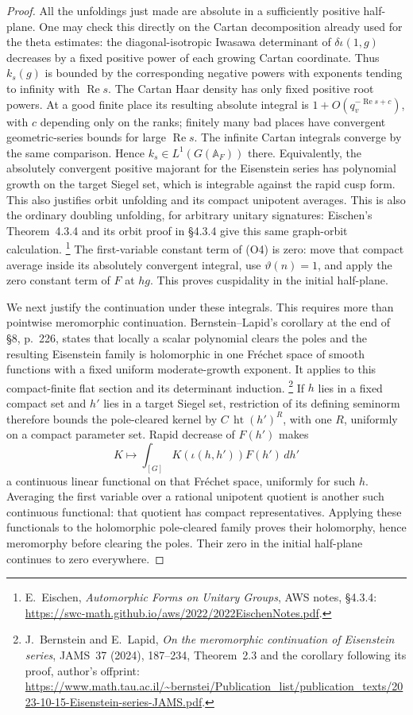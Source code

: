 \begin{proof}
All the unfoldings just made are absolute in a sufficiently
positive half-plane. One may check this directly on the
Cartan decomposition already used for the theta estimates:
the diagonal-isotropic Iwasawa determinant of
\(\delta\iota(1,g)\) decreases by a fixed positive power of
each growing Cartan coordinate. Thus \(k_s(g)\) is bounded
by the corresponding negative powers with exponents tending
to infinity with \(\operatorname{Re}s\).
The Cartan Haar density has only fixed positive root powers.
At a good finite place its resulting absolute integral is
\(1+O(q_v^{-\operatorname{Re}s+c})\), with \(c\) depending
only on the ranks; finitely many bad places have convergent
geometric-series bounds for large \(\operatorname{Re}s\).
The infinite Cartan integrals converge by the same comparison.
Hence \(k_s\in L^1(G(\mathbb A_F))\) there.
Equivalently, the absolutely convergent positive majorant
for the Eisenstein series has polynomial growth on the
target Siegel set, which is integrable against the rapid
cusp form. This also justifies orbit unfolding and its
compact unipotent averages. This is also the ordinary
doubling unfolding, for arbitrary unitary signatures:
Eischen's Theorem~4.3.4 and its orbit proof in
\S4.3.4 give this same graph-orbit calculation.
\footnote{E.~Eischen, \emph{Automorphic Forms on Unitary Groups},
AWS notes, \S4.3.4:
\url{https://swc-math.github.io/aws/2022/2022EischenNotes.pdf}.}
The first-variable constant term of (O4) is zero:
move that compact average inside its absolutely convergent
integral, use \(\vartheta(n)=1\), and apply the zero
constant term of \(F\) at \(hg\).
This proves cuspidality in the initial half-plane.

We next justify the continuation under these integrals.
This requires more than pointwise meromorphic continuation.
Bernstein--Lapid's corollary at the end of \S8, p.~226,
states that locally a scalar polynomial clears the poles
and the resulting Eisenstein family is holomorphic in one
Fr\'echet space of smooth functions with a fixed uniform
moderate-growth exponent. It applies to this compact-finite
flat section and its determinant induction.
\footnote{J.~Bernstein and E.~Lapid,
\emph{On the meromorphic continuation of Eisenstein series},
JAMS~37 (2024), 187--234, Theorem~2.3 and the corollary following
its proof, author's offprint:
\url{https://www.math.tau.ac.il/~bernstei/Publication_list/publication_texts/2023-10-15-Eisenstein-series-JAMS.pdf}.}
If \(h\) lies in a fixed compact set and \(h'\) lies in a
target Siegel set, restriction of its defining seminorm
therefore bounds the pole-cleared kernel by
\(C\,\operatorname{ht}(h')^R\), with one \(R\), uniformly
on a compact parameter set. Rapid decrease of \(F(h')\)
makes
\[
 K\longmapsto
       \int_{[G]}K(\iota(h,h'))F(h')\,dh'
\]
a continuous linear functional on that Fr\'echet space,
uniformly for such \(h\). Averaging the first variable
over a rational unipotent quotient is another such continuous
functional: that quotient has compact representatives.
Applying these functionals to the holomorphic pole-cleared
family proves their holomorphy, hence meromorphy before
clearing the poles. Their zero in the initial half-plane
continues to zero everywhere.


\end{proof}
